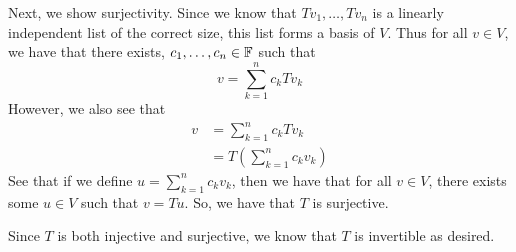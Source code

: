 \documentclass[answers]{exam}
\begin{document}
\begin{questions}
\begin{solution}
        Next, we show surjectivity.
        Since we know that $Tv_1,\dots,Tv_n$ is a linearly independent list of the correct size, this list
        forms a basis of $V$. Thus for all $v\in V$, we have that there exists, $c_1,\dots,c_n\in\mathbb{F}$ such that
        \[
            v = \sum_{k=1}^n c_kTv_k
        \]
        However, we also see that
        \begin{align*}
            v &= \sum_{k=1}^n c_kTv_k \\
            &= T\left(\sum_{k=1}^nc_kv_k\right)
        \end{align*}
        See that if we define $u = \sum_{k=1}^nc_kv_k$, then we have that for all $v\in V$, there exists some
        $u\in V$ such that $v=Tu$. So, we have that $T$ is surjective.

        Since $T$ is both injective and surjective, we know that $T$ is invertible as desired.
    \end{solution}
\end{questions}
\end{document}
